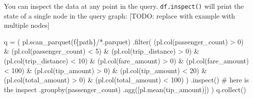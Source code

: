 \documentclass[
  letterpaper,
  DIV=11,
  numbers=noendperiod]{scrartcl}
\newenvironment{Shaded}{\begin{snugshade}}{\end{snugshade}}
\newcommand{\BuiltInTok}[1]{\textcolor[rgb]{0.00,0.23,0.31}{#1}}
\newcommand{\CommentTok}[1]{\textcolor[rgb]{0.37,0.37,0.37}{#1}}
\newcommand{\DecValTok}[1]{\textcolor[rgb]{0.68,0.00,0.00}{#1}}
\newcommand{\NormalTok}[1]{\textcolor[rgb]{0.00,0.23,0.31}{#1}}
\newcommand{\OperatorTok}[1]{\textcolor[rgb]{0.37,0.37,0.37}{#1}}
\newcommand{\SpecialCharTok}[1]{\textcolor[rgb]{0.37,0.37,0.37}{#1}}
\newcommand{\SpecialStringTok}[1]{\textcolor[rgb]{0.13,0.47,0.30}{#1}}
\newcommand{\StringTok}[1]{\textcolor[rgb]{0.13,0.47,0.30}{#1}}
\begin{document}
You can inspect the data at any point in the query.
\texttt{df.inspect()} will print the state of a single node in the query
graph: {[}TODO: replace with example with multiple nodes{]}

\begin{Shaded}
\begin{Highlighting}[]
\NormalTok{q }\OperatorTok{=}\NormalTok{ (}
\NormalTok{    pl.scan\_parquet(}\SpecialStringTok{f\textquotesingle{}}\SpecialCharTok{\{}\NormalTok{path}\SpecialCharTok{\}}\SpecialStringTok{/*.parquet\textquotesingle{}}\NormalTok{)}
\NormalTok{    .}\BuiltInTok{filter}\NormalTok{(}
\NormalTok{        (pl.col(}\StringTok{\textquotesingle{}passenger\_count\textquotesingle{}}\NormalTok{) }\OperatorTok{\textgreater{}} \DecValTok{0}\NormalTok{) }\OperatorTok{\&}
\NormalTok{        (pl.col(}\StringTok{\textquotesingle{}passenger\_count\textquotesingle{}}\NormalTok{) }\OperatorTok{\textless{}} \DecValTok{5}\NormalTok{) }\OperatorTok{\&}
\NormalTok{        (pl.col(}\StringTok{\textquotesingle{}trip\_distance\textquotesingle{}}\NormalTok{) }\OperatorTok{\textgreater{}} \DecValTok{0}\NormalTok{) }\OperatorTok{\&}
\NormalTok{        (pl.col(}\StringTok{\textquotesingle{}trip\_distance\textquotesingle{}}\NormalTok{) }\OperatorTok{\textless{}} \DecValTok{10}\NormalTok{) }\OperatorTok{\&}
\NormalTok{        (pl.col(}\StringTok{\textquotesingle{}fare\_amount\textquotesingle{}}\NormalTok{) }\OperatorTok{\textgreater{}} \DecValTok{0}\NormalTok{) }\OperatorTok{\&}
\NormalTok{        (pl.col(}\StringTok{\textquotesingle{}fare\_amount\textquotesingle{}}\NormalTok{) }\OperatorTok{\textless{}} \DecValTok{100}\NormalTok{) }\OperatorTok{\&}
\NormalTok{        (pl.col(}\StringTok{\textquotesingle{}tip\_amount\textquotesingle{}}\NormalTok{) }\OperatorTok{\textgreater{}} \DecValTok{0}\NormalTok{) }\OperatorTok{\&}
\NormalTok{        (pl.col(}\StringTok{\textquotesingle{}tip\_amount\textquotesingle{}}\NormalTok{) }\OperatorTok{\textless{}} \DecValTok{20}\NormalTok{) }\OperatorTok{\&}
\NormalTok{        (pl.col(}\StringTok{\textquotesingle{}total\_amount\textquotesingle{}}\NormalTok{) }\OperatorTok{\textgreater{}} \DecValTok{0}\NormalTok{) }\OperatorTok{\&}
\NormalTok{        (pl.col(}\StringTok{\textquotesingle{}total\_amount\textquotesingle{}}\NormalTok{) }\OperatorTok{\textless{}} \DecValTok{100}\NormalTok{)}
\NormalTok{    )}
\NormalTok{    .inspect() }\CommentTok{\# here is the inspect}
\NormalTok{    .groupby(}\StringTok{\textquotesingle{}passenger\_count\textquotesingle{}}\NormalTok{)}
\NormalTok{    .agg([pl.mean(}\StringTok{\textquotesingle{}tip\_amount\textquotesingle{}}\NormalTok{)])}
\NormalTok{    )}
\NormalTok{q.collect()}
\end{Highlighting}
\end{Shaded}
\end{document}
